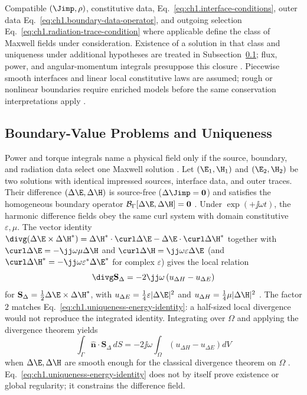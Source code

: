 Compatible $(\Jimp,\rho)$, constitutive data, Eq.~\eqref{eq:ch1.interface-conditions}, outer data Eq.~\eqref{eq:ch1.boundary-data-operator}, and outgoing selection Eq.~\eqref{eq:ch1.radiation-trace-condition} where applicable define the class of Maxwell fields under consideration. Existence of a solution in that class and uniqueness under additional hypotheses are treated in Subsection~\ref{sec:ch01.1.3}; flux, power, and angular-momentum integrals presuppose this closure \cite{maxwell1873,stratton1941}. Piecewise smooth interfaces and linear local constitutive laws are assumed; rough or nonlinear boundaries require enriched models before the same conservation interpretations apply \cite{stratton1941}.

\subsection{Boundary-Value Problems and Uniqueness}
\label{sec:ch01.1.3}

Power and torque integrals name a physical field only if the source, boundary, and radiation data select one Maxwell solution \cite{stratton1941,sommerfeld1949}. Let $(\E_1,\H_1)$ and $(\E_2,\H_2)$ be two solutions with identical impressed sources, interface data, and outer traces. Their difference $(\Delta\E,\Delta\H)$ is source-free ($\Delta\Jimp=\mathbf{0}$) and satisfies the homogeneous boundary operator $\mathcal{B}_\Gamma[\Delta\E,\Delta\H]=\mathbf{0}$ \cite{stratton1941}. Under $\exp(+\jj\omega t)$, the harmonic difference fields obey the same curl system with domain constitutive $\varepsilon,\mu$. The vector identity $\divg(\Delta\E\times\Delta\H^*)=\Delta\H^*\cdot\curl\Delta\E-\Delta\E\cdot\curl\Delta\H^*$ together with $\curl\Delta\E=-\jj\omega\mu\Delta\H$ and $\curl\Delta\H=\jj\omega\varepsilon\Delta\E$ (and $\curl\Delta\H^*=-\jj\omega\varepsilon^*\Delta\E^*$ for complex $\varepsilon$) gives the local relation
\begin{equation}
\label{eq:ch1.uniqueness-local-div}
\divg\mathbf{S}_\Delta=-2\jj\omega\left(u_{\Delta H}-u_{\Delta E}\right)
\end{equation}
for $\mathbf{S}_\Delta=\tfrac12\Delta\E\times\Delta\H^*$, with $u_{\Delta E}=\tfrac14\varepsilon|\Delta\E|^{2}$ and $u_{\Delta H}=\tfrac14\mu|\Delta\H|^{2}$ \cite{stratton1941}. The factor $2$ matches Eq.~\eqref{eq:ch1.uniqueness-energy-identity}: a half-sized local divergence would not reproduce the integrated identity. Integrating over $\Omega$ and applying the divergence theorem yields
\begin{equation}
\label{eq:ch1.uniqueness-energy-identity}
\int_{\Gamma}\hat{\mathbf{n}}\cdot\mathbf{S}_\Delta\,dS
=-2\jj\omega\!\int_{\Omega}\!\left(u_{\Delta H}-u_{\Delta E}\right)dV
\end{equation}
when $\Delta\E,\Delta\H$ are smooth enough for the classical divergence theorem on $\Omega$ \cite{stratton1941}. Eq.~\eqref{eq:ch1.uniqueness-energy-identity} does not by itself prove existence or global regularity; it constrains the difference field.

